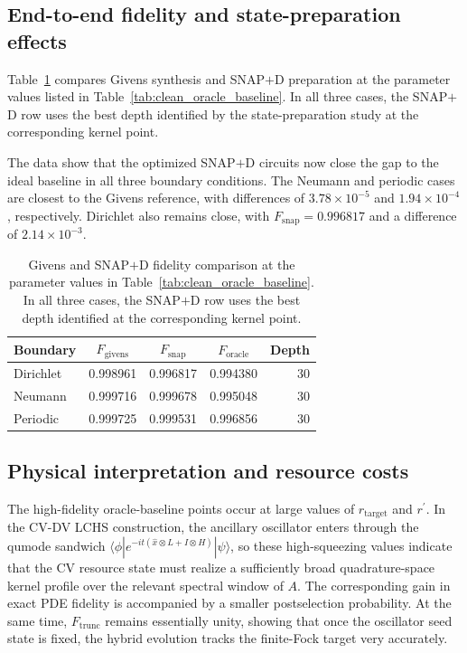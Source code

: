 \subsection{End-to-end fidelity and state-preparation effects}

Table~\ref{tab:clean_snap_comparison} compares Givens synthesis and SNAP$+$D preparation at the parameter values listed in Table~\ref{tab:clean_oracle_baseline}. In all three cases, the SNAP$+$D row uses the best depth identified by the state-preparation study at the corresponding kernel point.

The data show that the optimized SNAP$+$D circuits now close the gap to the ideal baseline in all three boundary conditions. The Neumann and periodic cases are closest to the Givens reference, with differences of $3.78\times 10^{-5}$ and $1.94\times 10^{-4}$, respectively. Dirichlet also remains close, with $F_{\mathrm{snap}}=0.996817$ and a difference of $2.14\times 10^{-3}$.

\begin{table}[h]
\centering
\caption{Givens and SNAP$+$D fidelity comparison at the parameter values in Table~\ref{tab:clean_oracle_baseline}. In all three cases, the SNAP$+$D row uses the best depth identified at the corresponding kernel point.}
\label{tab:clean_snap_comparison}
\begin{tabular}{lcccr}
\toprule
Boundary & $F_{\mathrm{givens}}$ & $F_{\mathrm{snap}}$ & $F_{\mathrm{oracle}}$ & Depth \\
\midrule
Dirichlet & 0.998961 & 0.996817 & 0.994380 & 30 \\
Neumann & 0.999716 & 0.999678 & 0.995048 & 30 \\
Periodic & 0.999725 & 0.999531 & 0.996856 & 30 \\
\bottomrule
\end{tabular}
\end{table}

\subsection{Physical interpretation and resource costs}

The high-fidelity oracle-baseline points occur at large values of $r_{\mathrm{target}}$ and $r^\prime$. In the CV-DV LCHS construction, the ancillary oscillator enters through the qumode sandwich $\langle \phi | e^{-it(\hat{x}\otimes L + I\otimes H)} | \psi \rangle$, so these high-squeezing values indicate that the CV resource state must realize a sufficiently broad quadrature-space kernel profile over the relevant spectral window of $A$. The corresponding gain in exact PDE fidelity is accompanied by a smaller postselection probability. At the same time, $F_{\mathrm{trunc}}$ remains essentially unity, showing that once the oscillator seed state is fixed, the hybrid evolution tracks the finite-Fock target very accurately.

